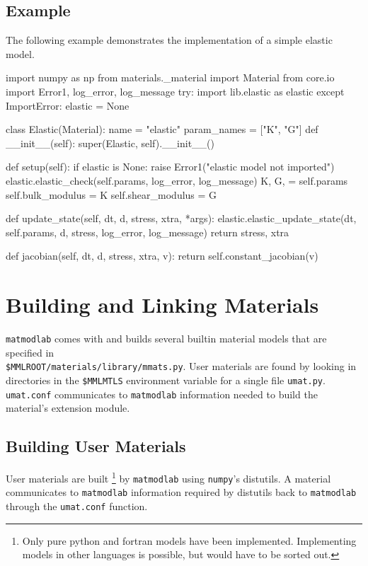 \documentclass[12pt,report,strict]{SANDreport/SANDreport}
\newenvironment{example}%
   {\par\noindent\adjustbox{margin=1ex,bgcolor=shadecolor,margin=0ex
       \medskipamount}\bgroup\minipage\textwidth\verbatim}%
   {\endverbatim\endminipage\egroup}
\newcommand{\mml}{\texttt{matmodlab}}
\begin{document}
\subsection{Example}
\label{sec:update-state-ex}
The following example demonstrates the implementation of a simple elastic
model.
\begin{example}
import numpy as np
from materials._material import Material
from core.io import Error1, log_error, log_message
try:
    import lib.elastic as elastic
except ImportError:
    elastic = None

class Elastic(Material):
    name = "elastic"
    param_names = ["K", "G"]
    def __init__(self):
        super(Elastic, self).__init__()

    def setup(self):
        if elastic is None:
            raise Error1("elastic model not imported")
        elastic.elastic_check(self.params, log_error, log_message)
        K, G, = self.params
        self.bulk_modulus = K
        self.shear_modulus = G

    def update_state(self, dt, d, stress, xtra, *args):
        elastic.elastic_update_state(dt, self.params, d, stress,
                                     log_error, log_message)
        return stress, xtra

    def jacobian(self, dt, d, stress, xtra, v):
        return self.constant_jacobian(v)
\end{example}

\section{Building and Linking Materials}
\label{sec:usrbld}
\mml{} comes with and builds several builtin material models that are
specified in \\
\verb|$MMLROOT/materials/library/mmats.py|. User materials are
found by looking in directories in the \verb|$MMLMTLS| environment variable
for a single file \texttt{umat.py}. \texttt{umat.conf} communicates to \mml{}
information needed to build the material's extension module.

\subsection{Building User Materials}
\label{sec:bld-usr}
User materials are built %
\footnote{Only pure python and fortran models have been implemented.
  Implementing models in other languages is possible, but would have to be
  sorted out.}
by \mml{} using \texttt{numpy}'s distutils.  A
material communicates to \mml{} information required by distutils back to
\mml{} through the \texttt{umat.conf} function.
\end{document}
